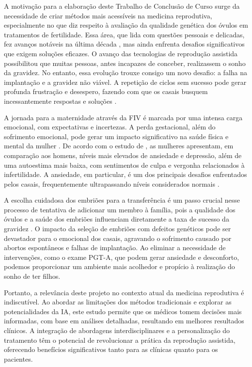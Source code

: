 A motivação para a elaboração deste Trabalho de Conclusão de Curso surge da necessidade de criar métodos mais acessíveis na medicina reprodutiva, especialmente no que diz respeito à avaliação da qualidade genética dos óvulos em tratamentos de fertilidade. Essa área, que lida com questões pessoais e delicadas, fez avanços notáveis na última década \cite{pandit2022}, mas ainda enfrenta desafios significativos que exigem soluções eficazes. O avanço das tecnologias de reprodução assistida possibilitou que muitas pessoas, antes incapazes de conceber, realizassem o sonho da gravidez. No entanto, essa evolução trouxe consigo um novo desafio: a falha na implantação e a gravidez não viável. A repetição de ciclos sem sucesso pode gerar profunda frustração e desespero, fazendo com que os casais busquem incessantemente respostas e soluções \cite{montagnini2010}.

A jornada para a maternidade através da FIV é marcada por uma intensa carga emocional, com expectativas e incertezas. A perda gestacional, além do sofrimento emocional, pode gerar um impacto significativo na saúde física e mental da mulher  \cite{montagnini2010}. De acordo com o estudo de , as mulheres apresentam, em comparação aos homens, níveis mais elevados de ansiedade e depressão, além de uma autoestima mais baixa, com sentimentos de culpa e vergonha relacionados à infertilidade. A ansiedade, em particular, é um dos principais desafios enfrentados pelos casais, frequentemente ultrapassando níveis considerados normais \cite{montagnini2010}.

A escolha cuidadosa dos embriões para a transferência é um passo crucial nesse processo de tentativa de adicionar um membro à família, pois a qualidade dos óvulos e a saúde dos embriões influenciam diretamente a taxa de sucesso da gravidez \cite{yang2024}. O impacto da seleção de embriões com defeitos genéticos pode ser devastador para o emocional dos casais, agravando o sofrimento causado por abortos espontâneos e falhas de implantação. Ao eliminar a necessidade de intervenções, como o exame PGT-A, que podem gerar ansiedade e desconforto, podemos proporcionar um ambiente mais acolhedor e propício à realização do sonho de ter filhos.

Portanto, a relevância deste projeto no contexto atual da medicina reprodutiva é indiscutível. Ao abordar as limitações dos métodos tradicionais e explorar as potencialidades da IA, este estudo permite que os médicos tomem decisões mais informadas, com base em análises detalhadas, resultando em melhores resultados clínicos. A integração de abordagens interdisciplinares e a personalização do tratamento têm o potencial de revolucionar a prática da reprodução assistida, oferecendo benefícios significativos tanto para as clínicas quanto para os pacientes.

